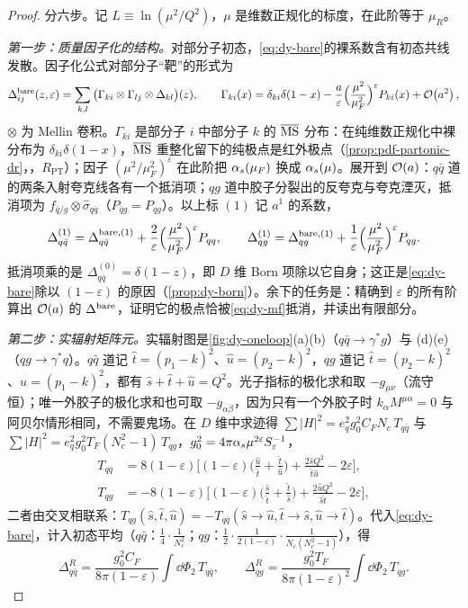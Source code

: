 \begin{proof}
分六步。记 $L\equiv\ln(\mu^2/Q^2)$，$\mu$ 是维数正规化的标度，在此阶等于 $\mu_R$。

\emph{第一步：质量因子化的结构。}对部分子初态，\cref{eq:dy-bare}的裸系数含有初态共线发散。因子化公式对部分子“靶”的形式为
\[
\Delta^{\rm bare}_{ij}(z,\varepsilon)=\sum_{k,l}\big(\Gamma_{ki}\otimes\Gamma_{lj}\otimes\Delta_{kl}\big)(z),\qquad
\Gamma_{ki}(x)=\delta_{ki}\delta(1-x)-\frac{a}{\varepsilon}\Big(\frac{\mu^2}{\mu_F^2}\Big)^{\varepsilon}P_{ki}(x)+\mathcal{O}\!\left(a^2\right),
\]
$\otimes$ 为 Mellin 卷积。$\Gamma_{ki}$ 是部分子 $i$ 中部分子 $k$ 的 $\overline{\mathrm{MS}}$ 分布：在纯维数正规化中裸分布为 $\delta_{ki}\delta(1-x)$，$\overline{\mathrm{MS}}$ 重整化留下的纯极点是红外极点（\cref{prop:pdf-partonic-dr}，\tagR，$R_{\mathrm{PT}}$）；因子 $(\mu^2/\mu_F^2)^\varepsilon$ 在此阶把 $\alpha_s(\mu_F)$ 换成 $\alpha_s(\mu)$。展开到 $\mathcal{O}\!\left(a\right)$：$q\bar q$ 道的两条入射夸克线各有一个抵消项；$qg$ 道中胶子分裂出的反夸克与夸克湮灭，抵消项为 $f_{\bar q/g}\otimes\hat\sigma_{q\bar q}$（$P_{\bar qg}=P_{qg}$）。以上标 $(1)$ 记 $a^1$ 的系数，
\begin{equation}\label{eq:dy-mf}
\Delta^{(1)}_{q\bar q}=\Delta^{{\rm bare},(1)}_{q\bar q}+\frac2\varepsilon\Big(\frac{\mu^2}{\mu_F^2}\Big)^{\varepsilon}P_{qq},\qquad
\Delta^{(1)}_{qg}=\Delta^{{\rm bare},(1)}_{qg}+\frac1\varepsilon\Big(\frac{\mu^2}{\mu_F^2}\Big)^{\varepsilon}P_{qg}.
\end{equation}
抵消项乘的是 $\Delta^{(0)}_{q\bar q}=\delta(1-z)$，即 $D$ 维 Born 项除以它自身；这正是\cref{eq:dy-bare}除以 $(1-\varepsilon)$ 的原因（\cref{prop:dy-born}）。余下的任务是：精确到 $\varepsilon$ 的所有阶算出 $\mathcal{O}\!\left(a\right)$ 的 $\Delta^{\rm bare}$，证明它的极点恰被\cref{eq:dy-mf}抵消，并读出有限部分。

\emph{第二步：实辐射矩阵元。}实辐射图是\cref{fig:dy-oneloop}(a)(b)（$q\bar q\to\gamma^*g$）与 (d)(e)（$qg\to\gamma^*q$）。$q\bar q$ 道记 $\hat t=(p_1-k)^2$、$\hat u=(p_2-k)^2$，$qg$ 道记 $\hat t=(p_2-k)^2$、$\hat u=(p_1-k)^2$，都有 $\hat s+\hat t+\hat u=Q^2$。光子指标的极化求和取 $-g_{\mu\nu}$（流守恒）；唯一外胶子的极化求和也可取 $-g_{\alpha\beta}$，因为只有一个外胶子时 $k_\alpha M^{\mu\alpha}=0$ 与阿贝尔情形相同，不需要鬼场。在 $D$ 维中求迹得 $\sum|H|^2=e_q^2g_0^2C_FN_c\,T_{q\bar q}$ 与 $\sum|H|^2=e_q^2g_0^2T_F(N_c^2-1)\,T_{qg}$，$g_0^2=4\pi\alpha_s\mu^{2\varepsilon}S_\varepsilon^{-1}$，
\begin{align}
T_{q\bar q}&=8(1-\varepsilon)\Big[(1-\varepsilon)\Big(\frac{\hat u}{\hat t}+\frac{\hat t}{\hat u}\Big)+\frac{2\hat sQ^2}{\hat t\hat u}-2\varepsilon\Big],\label{eq:dy-Tqq}\\
T_{qg}&=-8(1-\varepsilon)\Big[(1-\varepsilon)\Big(\frac{\hat s}{\hat t}+\frac{\hat t}{\hat s}\Big)+\frac{2\hat uQ^2}{\hat s\hat t}-2\varepsilon\Big],\label{eq:dy-Tqg}
\end{align}
二者由交叉相联系：$T_{qg}(\hat s,\hat t,\hat u)=-T_{q\bar q}(\hat s\to\hat u,\hat t\to\hat s,\hat u\to\hat t)$。代入\cref{eq:dy-bare}，计入初态平均（$q\bar q$：$\frac14\cdot\frac1{N_c^2}$；$qg$：$\frac12\cdot\frac{1}{2(1-\varepsilon)}\cdot\frac{1}{N_c(N_c^2-1)}$），得
\[
\Delta^R_{q\bar q}=\frac{g_0^2C_F}{8\pi(1-\varepsilon)}\int\dd\Phi_2\,T_{q\bar q},\qquad
\Delta^R_{qg}=\frac{g_0^2T_F}{8\pi(1-\varepsilon)^2}\int\dd\Phi_2\,T_{qg}.
\]


\end{proof}
